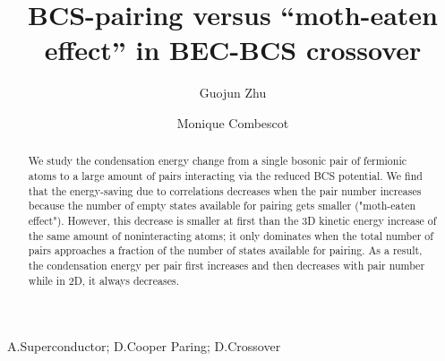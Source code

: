 \documentclass[5p,twocolumn]{elsarticle}
\begin{document}
\title{ BCS-pairing versus ``moth-eaten effect'' in BEC-BCS crossover}
\author[uiuc]{Guojun Zhu}
\author[uiuc,upmc]{Monique Combescot}

\address[uiuc]{Department of Physics, University of Illinois at Urbana-Champaign, 1110 W Green St, Urbana, IL, 61801}

\address[upmc]{Institut des NanoSciences de Paris, Universite Pierre et Marie Curie, CNRS, Tour 22, 4 place Jussieu, 75005 Paris }
\newcommand{\vk}{\ensuremath{\mathbf{k}}}
\providecommand{\vr}{\ensuremath{\mathbf{r}}}
\newcommand{\vp}{\ensuremath{\mathbf{p}}}


\providecommand{\comm}[1]{\textit{\scriptsize \uwave{(#1)}}}
\newcommand{\td}{{\ensuremath{{\text{(2D)}}}}}
\newcommand{\sd}{{\ensuremath{{\text{(3D)}}}}}
\newcommand{\Arctg}{\ensuremath{\text{Arctg}}}



\begin{abstract}
We study the condensation energy change from a single bosonic pair of fermionic atoms to a large amount of pairs interacting via the reduced BCS potential. We find that the energy-saving due to correlations decreases when the pair number increases because the number of empty states available for pairing gets smaller ("moth-eaten effect"). However, this decrease is smaller at first than the 3D kinetic energy increase of the same amount of noninteracting atoms; it only dominates  when the total number of pairs approaches a fraction of the number of states available for pairing. As a result, the condensation energy per pair first increases and then decreases with pair number while in 2D, it always decreases.  
\end{abstract}
\begin{keyword}
A.Superconductor; D.Cooper Paring; D.Crossover
\end{keyword}
\end{document}
